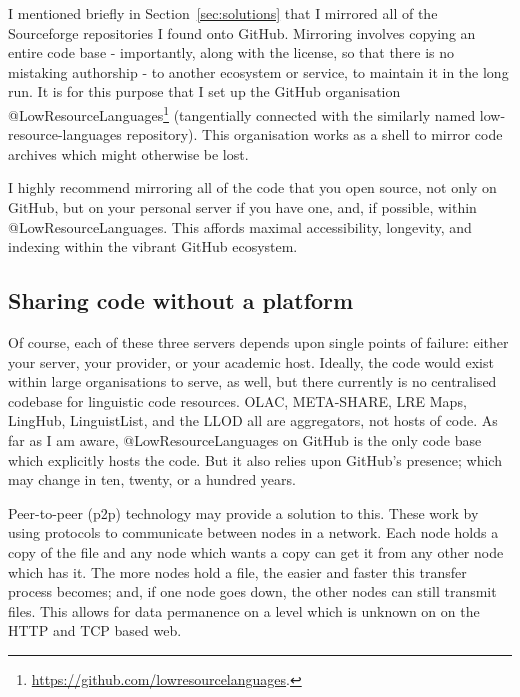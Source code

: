 I mentioned briefly in Section~\ref{sec:solutions} that I mirrored all of the Sourceforge repositories I found onto GitHub. Mirroring involves copying an entire code base - importantly, along with the license, so that there is no mistaking authorship - to another ecosystem or service, to maintain it in the long run. It is for this purpose that I set up the GitHub organisation @LowResourceLanguages\footnote{\href{https://github.com/lowresourcelanguages}{https://github.com/lowresourcelanguages}. } (tangentially connected with the similarly named low-resource-languages repository). This organisation works as a shell to mirror code archives which might otherwise be lost.

I highly recommend mirroring all of the code that you open source, not only on GitHub, but on your personal server if you have one, and, if possible, within @LowResourceLanguages. This affords maximal accessibility, longevity, and indexing within the vibrant GitHub ecosystem.

\subsection{Sharing code without a platform}
\label{subsec:sharing-code-without-a-platform}

Of course, each of these three servers depends upon single points of failure: either your server, your provider, or your academic host. Ideally, the code would exist within large organisations to serve, as well, but there currently is no centralised codebase for linguistic code resources. OLAC, META-SHARE, LRE Maps, LingHub, LinguistList, and the LLOD all are aggregators, not hosts of code. As far as I am aware, @LowResourceLanguages on GitHub is the only code base which explicitly hosts the code. But it also relies upon GitHub's presence; which may change in ten, twenty, or a hundred years.

Peer-to-peer (p2p) technology may provide a solution to this. These work by using protocols to communicate between nodes in a network. Each node holds a copy of the file and any node which wants a copy can get it from any other node which has it. The more nodes hold a file, the easier and faster this transfer process becomes; and, if one node goes down, the other nodes can still transmit files. This allows for data permanence on a level which is unknown on on the HTTP and TCP based web.

